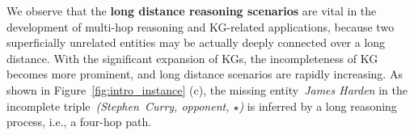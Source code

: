 
We observe that the \textbf{long distance reasoning scenarios} are vital in the development of multi-hop reasoning and KG-related applications, because two superficially unrelated entities may be actually deeply connected over a long distance.
With the significant expansion of KGs, the incompleteness of KG becomes more prominent, and long distance scenarios are rapidly increasing.
As shown in Figure~\ref{fig:intro_instance} (c), the missing entity~\textit{James Harden} in the incomplete triple~\textit{(Stephen~Curry, opponent, $\star$)} is inferred by a long reasoning process, i.e., a four-hop path.
